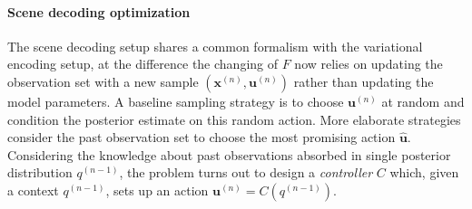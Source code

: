 \documentclass{article}
\begin{document}
\paragraph{Scene decoding optimization}
The scene decoding setup shares a common formalism with the variational encoding setup, at the difference the changing of $F$ now relies on updating the observation set
with a new sample $(\boldsymbol{x}^{(n)}, \boldsymbol{u}^{(n)})$ rather than updating the model parameters.
A baseline sampling strategy is to choose $\boldsymbol{u}^{(n)}$ at random and condition the posterior  estimate on this random action. 
More elaborate strategies consider the past observation set
to choose the most promising action $\hat{\boldsymbol{u}}$. %
Considering the knowledge about past observations absorbed in single posterior distribution $q^{(n-1)}$, the problem turns out to design  a \emph{controller} $C$ which, given a context $q^{(n-1)}$, sets up an action $\boldsymbol{u}^{(n)} = C(q^{(n-1)})$. 
\end{document}
